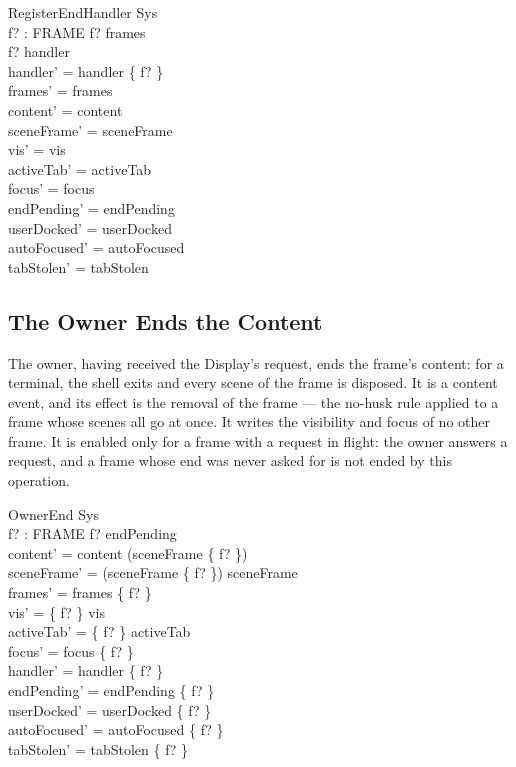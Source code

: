 \documentclass[a4paper,10pt,fleqn]{article}
\begin{document}
\begin{schema}{RegisterEndHandler}
  \Delta Sys \\
  f? : FRAME
\where
  f? \in frames \\
  f? \notin handler \\
  handler' = handler \cup \{ f? \} \\
  frames' = frames \\
  content' = content \\
  sceneFrame' = sceneFrame \\
  vis' = vis \\
  activeTab' = activeTab \\
  focus' = focus \\
  endPending' = endPending \\
  userDocked' = userDocked \\
  autoFocused' = autoFocused \\
  tabStolen' = tabStolen
\end{schema}

\subsection{The Owner Ends the Content}

The owner, having received the Display's request, ends the frame's content:
for a terminal, the shell exits and every scene of the frame is disposed.  It
is a content event, and its effect is the removal of the frame --- the
no-husk rule applied to a frame whose scenes all go at once.  It writes the
visibility and focus of no other frame.  It is enabled only for a frame with
a request in flight: the owner answers a request, and a frame whose end was
never asked for is not ended by this operation.

\begin{schema}{OwnerEnd}
  \Delta Sys \\
  f? : FRAME
\where
  f? \in endPending \\
  content' = content \setminus \dom (sceneFrame \rres \{ f? \}) \\
  sceneFrame' = \dom (sceneFrame \rres \{ f? \}) \ndres sceneFrame \\
  frames' = frames \setminus \{ f? \} \\
  vis' = \{ f? \} \ndres vis \\
  activeTab' = \{ f? \} \ndres activeTab \\
  focus' = focus \setminus \{ f? \} \\
  handler' = handler \setminus \{ f? \} \\
  endPending' = endPending \setminus \{ f? \} \\
  userDocked' = userDocked \setminus \{ f? \} \\
  autoFocused' = autoFocused \setminus \{ f? \} \\
  tabStolen' = tabStolen \setminus \{ f? \}
\end{schema}
\end{document}
